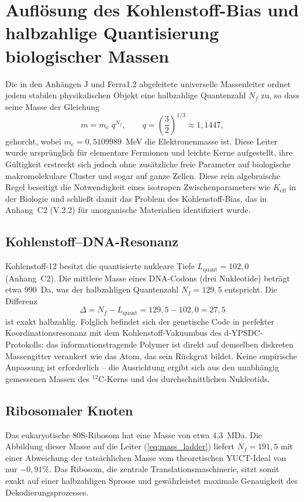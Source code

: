 \documentclass[12pt,a4paper]{article}
\begin{document}
	\section{Auflösung des Kohlenstoff-Bias und halbzahlige Quantisierung biologischer Massen}
	\label{sec:quantization}
	
	Die in den Anhängen J und Ferra1.2 abgeleitete universelle Massenleiter ordnet jedem stabilen physikalischen Objekt eine halbzahlige Quantenzahl \(N_f\) zu, so dass seine Masse der Gleichung
	\begin{equation}
		m = m_e \; q^{N_f}, \qquad q = \left(\frac{3}{2}\right)^{1/3} \approx 1,1447,
		\label{eq:mass_ladder}
	\end{equation}
	gehorcht, wobei \(m_e = 0,5109989\)~MeV die Elektronenmasse ist. Diese Leiter wurde ursprünglich für elementare Fermionen und leichte Kerne aufgestellt, ihre Gültigkeit erstreckt sich jedoch ohne zusätzliche freie Parameter auf biologische makromolekulare Cluster und sogar auf ganze Zellen. Diese rein algebraische Regel beseitigt die Notwendigkeit eines isotropen Zwischenparameters wie \(K_{\mathrm{eff}}\) in der Biologie und schließt damit das Problem des Kohlenstoff-Bias, das in Anhang~C2 (V.2.2) für anorganische Materialien identifiziert wurde.
	
	\subsection{Kohlenstoff–DNA-Resonanz}
	Kohlenstoff‑12 besitzt die quantisierte nukleare Tiefe \(L_{\mathrm{quant}} = 102,0\) (Anhang~C2). Die mittlere Masse eines DNA-Codons (drei Nukleotide) beträgt etwa 990~Da, was der halbzahligen Quantenzahl \(N_f = 129,5\) entspricht. Die Differenz
	\[
	\Delta = N_f - L_{\mathrm{quant}} = 129,5 - 102,0 = 27,5
	\]
	ist exakt halbzahlig. Folglich befindet sich der genetische Code in perfekter Koordinationsresonanz mit dem Kohlenstoff-Vakuumbus des d‑YPSDC-Protokolls: das informationstragende Polymer ist direkt auf demselben diskreten Massengitter verankert wie das Atom, das sein Rückgrat bildet. Keine empirische Anpassung ist erforderlich – die Ausrichtung ergibt sich aus den unabhängig gemessenen Massen des \(^{12}\mathrm{C}\)-Kerns und des durchschnittlichen Nukleotids.
	
	\subsection{Ribosomaler Knoten}
	Das eukaryotische 80S-Ribosom hat eine Masse von etwa 4,3~MDa. Die Abbildung dieser Masse auf die Leiter (\ref{eq:mass_ladder}) liefert \(N_f = 191,5\) mit einer Abweichung der tatsächlichen Masse vom theoretischen YUCT-Ideal von nur \(-0,91\%\). Das Ribosom, die zentrale Translationsmaschinerie, sitzt somit exakt auf einer halbzahligen Sprosse und gewährleistet maximale Genauigkeit des Dekodierungsprozesses.
	
\end{document}
